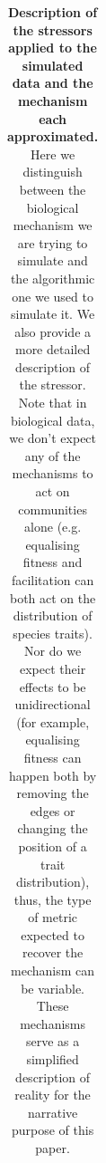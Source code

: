 \documentclass[12pt,letterpaper]{article}
\providecommand{\DIFaddbeginFL}{} %
\providecommand{\DIFaddendFL}{} %
\providecommand{\DIFdelbeginFL}{} %
\providecommand{\DIFdelendFL}{} %
\newcommand{\DIFscaledelfig}{0.5}
\newlength{\DIFdelgraphicswidth} %
\newlength{\DIFdelgraphicsheight} %
\newcommand{\DIFaddincludegraphics}[2][]{{\color{blue}\fbox{\DIFOincludegraphics[#1]{#2}}}} %
\newcommand{\DIFdelincludegraphics}[2][]{%
\sbox{\DIFdelgraphicsbox}{\DIFOincludegraphics[#1]{#2}}%
\settoboxwidth{\DIFdelgraphicswidth}{\DIFdelgraphicsbox} %
\settoboxtotalheight{\DIFdelgraphicsheight}{\DIFdelgraphicsbox} %
\scalebox{\DIFscaledelfig}{%
\parbox[b]{\DIFdelgraphicswidth}{\usebox{\DIFdelgraphicsbox}\\[-\baselineskip] \rule{\DIFdelgraphicswidth}{0em}}\llap{\resizebox{\DIFdelgraphicswidth}{\DIFdelgraphicsheight}{%
\setlength{\unitlength}{\DIFdelgraphicswidth}%
\begin{picture}(1,1)%
\thicklines\linethickness{2pt} %
{\color[rgb]{1,0,0}\put(0,0){\framebox(1,1){}}}%
{\color[rgb]{1,0,0}\put(0,0){\line( 1,1){1}}}%
{\color[rgb]{1,0,0}\put(0,1){\line(1,-1){1}}}%
\end{picture}%
}\hspace*{3pt}}} %
} %
\DeclareRobustCommand{\DIFaddbeginFL}{\DIFOaddbeginFL \let\includegraphics\DIFaddincludegraphics} %
\DeclareRobustCommand{\DIFaddendFL}{\DIFOaddendFL \let\includegraphics\DIFOincludegraphics} %
\DeclareRobustCommand{\DIFdelbeginFL}{\DIFOdelbeginFL \let\includegraphics\DIFdelincludegraphics} %
\DeclareRobustCommand{\DIFdelendFL}{\DIFOaddendFL \let\includegraphics\DIFOincludegraphics} %
\begin{document}
\begin{table}
\begin{tabular}{p{0.2\linewidth}|p{0.2\linewidth}|p{0.4\linewidth}|p{0.2\linewidth}}
    \end{tabular}
    \caption{\DIFdelbeginFL %
\DIFdelendFL \DIFaddbeginFL \scriptsize{\textbf{Description of the stressors applied to the simulated data and the mechanism each approximated.} Here we distinguish between the biological mechanism we are trying to simulate and the algorithmic one we used to simulate it. We also provide a more detailed description of the stressor. Note that in biological data, we don't expect any of the mechanisms to act on communities alone (e.g. equalising fitness and facilitation can both act on the distribution of species traits). Nor do we expect their effects to be unidirectional (for example, equalising fitness can happen both by removing the edges or changing the position of a trait distribution), thus, the type of metric expected to recover the mechanism can be variable. These mechanisms serve as a simplified description of reality for the narrative purpose of this paper.}
\DIFaddendFL }
    \label{Tab:mechanisms}
\end{table}
\end{document}
